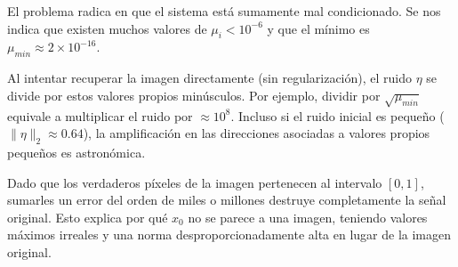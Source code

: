 \documentclass{article}
\begin{document}
\begin{enumerate}[label=\roman*., widest=ii]
  El problema radica en que el sistema está sumamente mal condicionado. Se nos indica que existen muchos valores de $\mu_i < 10^{-6}$ y que el mínimo es $\mu_{min} \approx 2 \times 10^{-16}$. 

  Al intentar recuperar la imagen directamente (sin regularización), el ruido $\eta$ se divide por estos valores propios minúsculos. Por ejemplo, dividir por $\sqrt{\mu_{min}}$ equivale a multiplicar el ruido por $\approx 10^8$. Incluso si el ruido inicial es pequeño ($\|\eta\|_2 \approx 0.64$), la amplificación en las direcciones asociadas a valores propios pequeños es astronómica. 

  Dado que los verdaderos píxeles de la imagen pertenecen al intervalo $[0, 1]$, sumarles un error del orden de miles o millones destruye completamente la señal original. Esto explica por qué $x_0$ no se parece a una imagen, teniendo valores máximos irreales y una norma desproporcionadamente alta en lugar de la imagen original.

  \end{enumerate}
\despueslista

\end{document}

